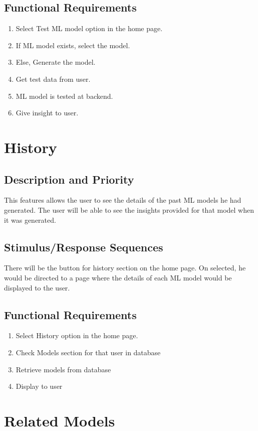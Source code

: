\documentclass{scrreprt}
\begin{document}
\subsection{Functional Requirements}
\begin{enumerate}
\item Select Test ML model option in the home page.
\item If ML model exists, select the model.
\item Else, Generate the model.
\item Get test data from user.
\item ML model is tested at backend.
\item Give insight to user.
\end{enumerate}

\section{History}

\subsection{Description and Priority}
This features allows the user to see the details of the past ML models he had generated. The user will be able to see the insights provided for that model when it was generated.

\subsection{Stimulus/Response Sequences}
 There will be the button for history section on the home page. On selected, he would be directed to a page where the details of each ML model would be displayed to the user.

\subsection{Functional Requirements}
\begin{enumerate}
\item Select History option in the home page.
\item Check Models section for that user in database
\item Retrieve models from database
\item Display to user
\end{enumerate}

\section{Related Models}
\end{document}
